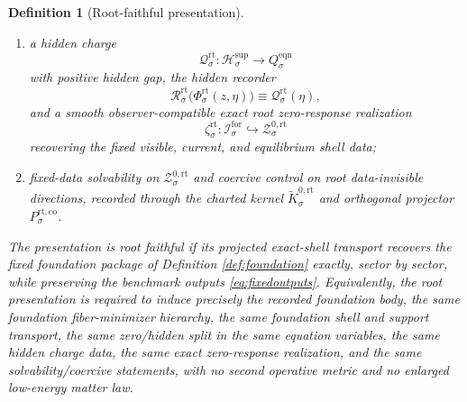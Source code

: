 \documentclass[11pt]{article}
\newcommand{\ForSpace}[1]{\mathcal I_{#1}^{\mathrm{for}}}
\newcommand{\FoundShellSet}[1]{\mathcal Z_{#1}^{\mathrm{fdn}}}
\newcommand{\FoundSupportShell}[1]{\mathcal Z_{#1}^{\mathrm{fdn,sup}}}
\newcommand{\FoundZeroCore}[1]{\mathcal Z_{#1}^{0,\mathrm{fdn}}}
\newcommand{\RootProj}[1]{\Pi_{#1}^{\mathrm{rt}}}
\newcommand{\RootShellSet}[1]{\mathcal Z_{#1}^{\mathrm{rt}}}
\newcommand{\RootSupportShell}[1]{\mathcal Z_{#1}^{\mathrm{rt,sup}}}
\newcommand{\RootZeroCore}[1]{\mathcal Z_{#1}^{0,\mathrm{rt}}}
\newcommand{\RootZeroChart}[1]{\Psi_{#1}^{0,\mathrm{rt}}}
\newcommand{\RootSplit}[1]{\Phi_{#1}^{\mathrm{rt}}}
\newcommand{\RootCharge}[1]{\mathcal Q_{#1}^{\mathrm{rt}}}
\newcommand{\RootResidual}[1]{\mathcal R_{#1}^{\mathrm{rt}}}
\newcommand{\RootEmbed}[1]{\zeta_{#1}^{\mathrm{rt}}}
\newcommand{\RootKernelCh}[1]{\widetilde K_{#1}^{0,\mathrm{rt}}}
\newcommand{\RootStateComp}[1]{P_{#1}^{\mathrm{rt,co}}}
\newcommand{\SeedHidden}[1]{\mathcal H_{#1}^{\mathrm{sup}}}
\newcommand{\SeedHiddenBody}[1]{D_{#1}^{\mathrm{sup}}}
\newcommand{\EqnTarget}[1]{Q_{#1}^{\mathrm{eqn}}}
\newcommand{\EqnZero}[1]{V_{#1}^{\mathrm{eqn},0}}
\newtheorem{definition}{Definition}
\begin{document}
\begin{definition}[Root-faithful presentation]
\begin{enumerate}
    a zero chart
    \[
    \RootZeroChart{\sigma}:\RootZeroCore{\sigma}\to\EqnZero{\sigma},
    \]
    and a diffeomorphism
    \[
    \RootSplit{\sigma}:
    \RootZeroCore{\sigma}\times\SeedHiddenBody{\sigma}
    \xrightarrow{\cong}
    \RootSupportShell{\sigma}
    \]
    obeying the same zero/hidden split in the same equation variables, with
    \[
    \RootProj{\sigma}\big|_{\RootShellSet{\sigma}},
    \qquad
    \RootProj{\sigma}\big|_{\RootSupportShell{\sigma}},
    \qquad
    \RootProj{\sigma}\big|_{\RootZeroCore{\sigma}}
    \]
    diffeomorphisms onto the fixed loci \(\FoundShellSet{\sigma}\), \(\FoundSupportShell{\sigma}\), and \(\FoundZeroCore{\sigma}\);
    \item a hidden charge
    \[
    \RootCharge{\sigma}:\SeedHidden{\sigma}\to\EqnTarget{\sigma}
    \]
    with positive hidden gap, the hidden recorder
    \[
    \RootResidual{\sigma}\bigl(\RootSplit{\sigma}(z,\eta)\bigr)
    \equiv
    \RootCharge{\sigma}(\eta),
    \]
    and a smooth observer-compatible exact root zero-response realization
    \[
    \RootEmbed{\sigma}:\ForSpace{\sigma}\hookrightarrow\RootZeroCore{\sigma}
    \]
    recovering the fixed visible, current, and equilibrium shell data;
    \item fixed-data solvability on \(\RootZeroCore{\sigma}\) and coercive control on root data-invisible directions, recorded through the charted kernel \(\RootKernelCh{\sigma}\) and orthogonal projector \(\RootStateComp{\sigma}\).
\end{enumerate}
The presentation is \emph{root faithful} if its projected exact-shell transport recovers the fixed foundation package of Definition \ref{def:foundation} exactly, sector by sector, while preserving the benchmark outputs \eqref{eq:fixedoutputs}. Equivalently, the root presentation is required to induce precisely the recorded foundation body, the same foundation fiber-minimizer hierarchy, the same foundation shell and support transport, the same zero/hidden split in the same equation variables, the same hidden charge data, the same exact zero-response realization, and the same solvability/coercive statements, with no second operative metric and no enlarged low-energy matter law.
\end{definition}
\end{document}
